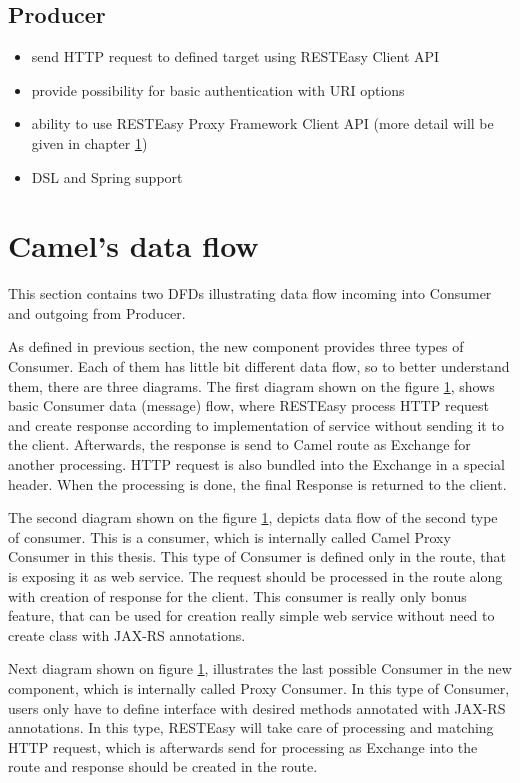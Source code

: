 \documentclass[12pt,final,oneside]{fithesis2}
\begin{document}
\subsection{Producer}
\begin{itemize}
\item
send HTTP request to defined target using RESTEasy Client API

\item
provide possibility for basic authentication with URI options

\item
ability to use RESTEasy Proxy Framework Client API (more detail will be given in chapter \ref{})

\item
DSL and Spring support
\end{itemize}

\section{Camel's data flow}
This section contains two DFDs illustrating data flow incoming into Consumer and outgoing from Producer. 

As defined in previous section, the new component provides three types of Consumer. Each of them has little bit different data flow, so to better understand them, there are three diagrams. The first diagram shown on the figure \ref{}, shows basic Consumer data (message) flow, where RESTEasy process HTTP request and create response according to implementation of service without sending it to the client. Afterwards, the response is send to Camel route as Exchange for another processing. HTTP request is also bundled into the Exchange in a special header. When the processing  is done, the final Response is returned to the client. 

The second diagram shown on the figure \ref{}, depicts data flow of the second type of consumer. This is a consumer, which is internally called Camel Proxy Consumer in this thesis. This type of Consumer is defined only in the route, that is exposing it as web service. The request should be processed in the route along with creation of response for the client. This consumer is really only bonus feature, that can be used for creation really simple web service without need to create class with JAX-RS annotations. 

Next diagram shown on figure \ref{}, illustrates the last possible Consumer in the new component, which is internally called Proxy Consumer. In this type of Consumer, users only have to define interface with desired methods annotated with JAX-RS annotations. In this type, RESTEasy will take care of processing and matching HTTP request, which is afterwards send for processing as Exchange into the route and response should be created in the route.  
\end{document}
